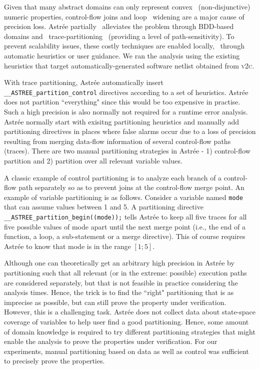 %
%
Given that many abstract domains can only represent convex  
(non-disjunctive) numeric properties, control-flow joins and loop  
widening are a major cause of precision loss.  Astr{\'e}e partially  
alleviates the problem through BDD-based domains and 
trace-partitioning~\cite{DBLP:journals/toplas/RivalM07}
(providing a level of path-sensitivity). 
To prevent scalability 
 issues, 
 these costly techniques are enabled locally, 
 through automatic heuristics 
or user guidance. We ran the analysis using the existing heuristics that 
target automatically-generated software netlist obtained from \textsc{v2c}. 


With trace partitioning, Astr{\'e}e automatically insert 
\texttt{\_\_ASTREE\_partition\_control} directives according to a set of 
heuristics.  Astr{\'e}e does not partition ``everything" since this would 
be too expensive in practise. Such a high precision is also normally not 
required for a runtime error analysis. Astr{\'e}e normally start with exisitng 
partitioning heuristics and manually add partitioning directives in places 
where false alarms occur due to a loss of precision resulting from merging 
data-flow information of several control-flow paths (traces).
There are two manual partitioning strategies in Astr{\'e}e - 
1) control-flow partition and 2) partition over all relevant variable values.


A classic example of control partitioning is to analyze each branch of a 
control-flow path separately so as to prevent joins at the control-flow merge 
point.  An example of variable partitioning is as follows. Consider a variable 
named \texttt{mode} that can assume values between 1 and 5.  A partitioning directive 
\texttt{\_\_ASTREE\_partition\_begin((mode));} tells Astr{\'e}e to keep all 
five traces for all five possible values of mode apart 
until the next merge point (i.e., the end of a function, a loop, a sub-statement 
or a merge directive). This of course requires Astr{\'e}e to know that mode is 
in the range $[1;5]$.


Although one can theoretically get an arbitrary high precision in Astr{\'e}e by 
partitioning such that all relevant (or in the extreme: possible) execution 
paths are considered separately, but that is not feasible in practice considering 
the analysis times. Hence, the trick is to find the ``right" partitioning that 
is as imprecise as possible, but can still prove the property under verification.  
However, this is a challenging task.  Astr{\'e}e does not collect data about 
state-space coverage of variables to help user find a good partitioning.  Hence, 
some amount of domain knowledge is required to try different partitioning 
strategies that might enable the analysis to prove the properties under verification. 
For our experiments, manual partitioning based on data as well as control was sufficient 
to precisely prove the properties. 



